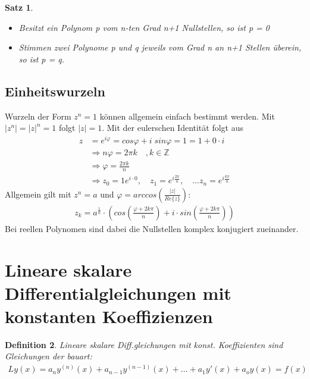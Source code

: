 \documentclass[12pt,a4paper]{article}%
\newtheorem{satz}{Satz}[section]
\newtheorem{definition}[satz]{Definition}
\numberwithin{equation}{section}
\newcommand{\Z}{\mathbb{Z}}
\numberwithin{equation}{subsection}
\begin{document}
    \begin{satz} $\;$
      \begin{itemize}
        \item[a)]
          Besitzt ein Polynom p vom n-ten Grad n+1 Nullstellen, so ist p = 0
        \item[b)]
          Stimmen zwei Polynome p und q jeweils vom Grad n an n+1 Stellen überein, so ist p = q.
      \end{itemize}
    \end{satz}
    
  \subsection{Einheitswurzeln}
  Wurzeln der Form $z^n = 1$ können allgemein einfach bestimmt werden. Mit $|z^n| = |z|^n = 1$ folgt $|z| = 1$. Mit der eulerschen Identität folgt aus
  \begin{align*}
    z &= e^{i\varphi} = cos \varphi + i \; sin\varphi = 1 = 1 + 0 \cdot i\\
    &\Rightarrow n\varphi = 2 \pi k \quad ,k \in \Z\\
    &\Rightarrow \varphi = \frac{2\pi k}{n}\\
    &\Rightarrow z_0 = 1 e^{i\cdot 0},\quad z_1 = e^{i\frac{2\pi}{n}}, \quad ... z_n = e^{i\frac{k\pi}{n}}
  \end{align*}    
  Allgemein gilt mit $z^n = a$ und $\varphi = arccos\left(\frac{|z|}{Re\{z\}}\right)$:
  \begin{align}
    z_k = a^{\frac{1}{n}} \cdot \left(cos\left(\frac{\varphi + 2k\pi}{n}\right) + i\cdot sin\left(\frac{\varphi + 2k\pi}{n}\right)\right)
  \end{align}
  Bei reellen Polynomen sind dabei die Nullstellen komplex konjugiert zueinander.
  \newpage
  
\section{Lineare skalare Differentialgleichungen mit konstanten Koeffizienzen}
  \begin{definition}
    Lineare skalare Diff.gleichungen mit konst. Koeffizienten sind Gleichungen der bauart:
    \begin{align*}
      Ly(x) = a_n y^{(n)}(x)+a_{n-1}y^{(n-1)}(x)+...+a_1y'(x) + a_o y(x) = f(x)
    \end{align*}
  \end{definition}
\end{document}
